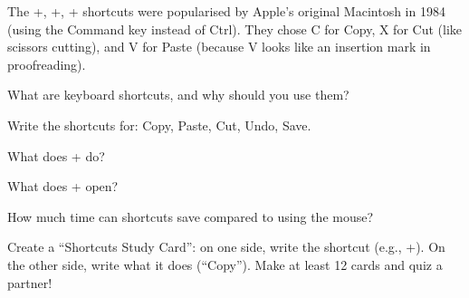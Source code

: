 \begin{funfact}
The +, +, + shortcuts were popularised by Apple's original Macintosh in 1984 (using the Command key instead of Ctrl). They chose C for Copy, X for Cut (like scissors cutting), and V for Paste (because V looks like an insertion mark in proofreading).
\end{funfact}

\begin{reviewqs}
  \item What are keyboard shortcuts, and why should you use them?
  \item Write the shortcuts for: Copy, Paste, Cut, Undo, Save.
  \item What does + do?
  \item What does + open?
  \item How much time can shortcuts save compared to using the mouse?
\end{reviewqs}

\begin{challenge}
Create a ``Shortcuts Study Card'': on one side, write the shortcut (e.g., +). On the other side, write what it does (``Copy''). Make at least 12 cards and quiz a partner!
\end{challenge}
